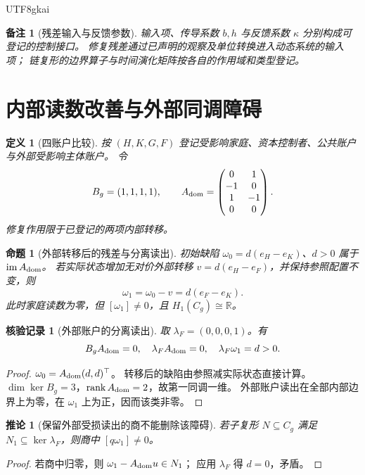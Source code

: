 \documentclass[12pt,a4paper,openany]{report}
\newtheorem{definition}{定义}[chapter]
\newtheorem{proposition}{命题}[chapter]
\newtheorem{corollary}{推论}[chapter]
\newtheorem{remark}{备注}[chapter]
\newtheorem{Certificate}{核验记录}[chapter]
\numberwithin{equation}{chapter}
\newcommand{\RR}{\mathbb R}
\newcommand{\im}{\operatorname{im}}
\newcommand{\rank}{\operatorname{rank}}
\begin{document}
\begin{CJK*}{UTF8}{gkai}
\begin{remark}[残差输入与反馈参数]
输入项、传导系数 $b,h$ 与反馈系数 $\kappa$ 分别构成可登记的控制接口。
修复残差通过已声明的观察及单位转换进入动态系统的输入项；
链复形的边界算子与时间演化矩阵按各自的作用域和类型登记。
\end{remark}

\section{内部读数改善与外部同调障碍}

\begin{definition}[四账户比较]
按 $(H,K,G,F)$ 登记受影响家庭、资本控制者、公共账户与外部受影响主体账户。
令
\[
 B_g=(1,1,1,1),\qquad
 A_{\rm dom}=
 \begin{pmatrix}
 0&1\\-1&0\\1&-1\\0&0
 \end{pmatrix}.
\]
修复作用限于已登记的两项内部转移。
\end{definition}

\begin{proposition}[外部转移后的残差与分离读出]
\label{prop:external}
初始缺陷 $\omega_0=d(e_H-e_K)$、$d>0$ 属于 $\im A_{\rm dom}$。
若实际状态增加无对价外部转移 $v=d(e_H-e_F)$，并保持参照配置不变，则
\[
 \omega_1=\omega_0-v=d(e_F-e_K).
\]
此时家庭读数为零，但 $[\omega_1]\ne0$，且
$H_1(C_g)\cong\RR$。
\end{proposition}
\begin{Certificate}[外部账户的分离读出]
取 $\lambda_F=(0,0,0,1)$。有
\[
 B_gA_{\rm dom}=0,\quad
 \lambda_FA_{\rm dom}=0,\quad
 \lambda_F\omega_1=d>0.
\]
\end{Certificate}
\begin{proof}
$\omega_0=A_{\rm dom}(d,d)^\top$。
转移后的缺陷由参照减实际状态直接计算。
$\dim\ker B_g=3$，$\rank A_{\rm dom}=2$，故第一同调一维。
外部账户读出在全部内部边界上为零，在 $\omega_1$ 上为正，因而该类非零。
\end{proof}

\begin{corollary}[保留外部受损读出的商不能删除该障碍]
若子复形 $N\subseteq C_g$ 满足 $N_1\subseteq\ker\lambda_F$，则商中 $[q\omega_1]\ne0$。
\end{corollary}
\begin{proof}
若商中归零，则 $\omega_1-A_{\rm dom}u\in N_1$；
应用 $\lambda_F$ 得 $d=0$，矛盾。
\end{proof}


\end{CJK*}
\end{document}
